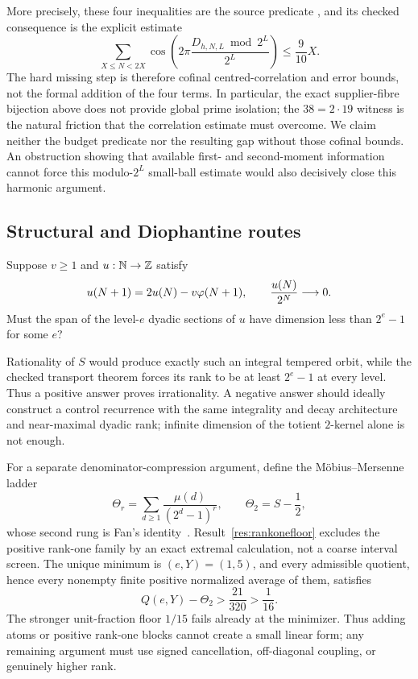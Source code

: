 \documentclass[11pt]{article}
\newcommand{\Stot}{S}
\begin{document}
More precisely, these four inequalities are the source predicate
,
and its checked consequence
is the explicit estimate
\[
 \sum_{X\le N<2X}\cos\!\left(2\pi
   \frac{D_{h,N,L}\bmod 2^L}{2^L}\right)\le\frac9{10}X.
\]
The hard missing step is therefore cofinal centred-correlation
and error bounds, not the formal addition of the four terms.  In particular,
the exact supplier-fibre bijection above does not provide global prime
isolation; the $38=2\cdot19$ witness is the natural friction that the
correlation estimate must overcome.  We claim neither the budget predicate nor
the resulting gap without those cofinal bounds.
An obstruction showing that available first- and second-moment information
cannot force this modulo-$2^L$ small-ball estimate would also decisively close
this harmonic argument.

\subsection{Structural and Diophantine routes}

\begin{problem}\label{prob:carryrank}
Suppose $v\ge1$ and $u:\mathbb{N}\to\mathbb{Z}$ satisfy
\[
 u(N+1)=2u(N)-v\varphi(N+1),\qquad \frac{u(N)}{2^N}\longrightarrow0.
\]
Must the span of the level-$e$ dyadic sections of $u$ have dimension less
than $2^e-1$ for some $e$?
\end{problem}

\noindent Rationality of $\Stot$ would produce exactly such an integral
tempered orbit, while the checked transport theorem forces its rank to be at
least $2^e-1$ at every level.  Thus a positive answer proves irrationality.
A negative answer should ideally construct a control recurrence with the same
integrality and decay architecture and near-maximal dyadic rank; infinite
dimension of the totient $2$-kernel alone is not enough.

For a separate denominator-compression argument, define the M\"obius--Mersenne
ladder
\[
 \Theta_r=\sum_{d\ge1}\frac{\mu(d)}{(2^d-1)^r},
 \qquad \Theta_2=\Stot-\frac12,
\]
whose second rung is Fan's identity~\cite{fan2026totient}.
Result~\ref{res:rankonefloor} excludes the positive rank-one family by an
exact extremal calculation, not a coarse interval screen.  The unique minimum
is $(e,Y)=(1,5)$, and every admissible quotient, hence every nonempty finite
positive normalized average of them, satisfies
\[
 Q(e,Y)-\Theta_2>\frac{21}{320}>\frac1{16}.
\]
The stronger unit-fraction floor $1/15$ fails already at the minimizer.  Thus
adding atoms or positive rank-one blocks cannot create a small linear form;
any remaining argument must use signed cancellation, off-diagonal coupling, or
genuinely higher rank.
\end{document}
